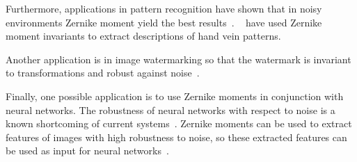 Furthermore, applications in pattern recognition have shown that in noisy environments Zernike moment yield the best results~\cite{pattern_recognition}. \citeauthor{hand_vein}~\cite{hand_vein} have used Zernike moment invariants to extract descriptions of hand vein patterns.

Another application is in image watermarking so that the watermark is invariant to transformations and robust against noise~\cite{watermarking_auth, robust_watermarking, invariant_watermark}.

Finally, one possible application is to use Zernike moments in conjunction with neural networks. The robustness of neural networks with respect to noise is a known shortcoming of current systems~\cite{nn_robust,nn_noise_robust}. Zernike moments can be used to extract features of images with high robustness to noise, so these extracted features can be used as input for neural networks~\cite{zernike_nn,zernike_nn2}. 